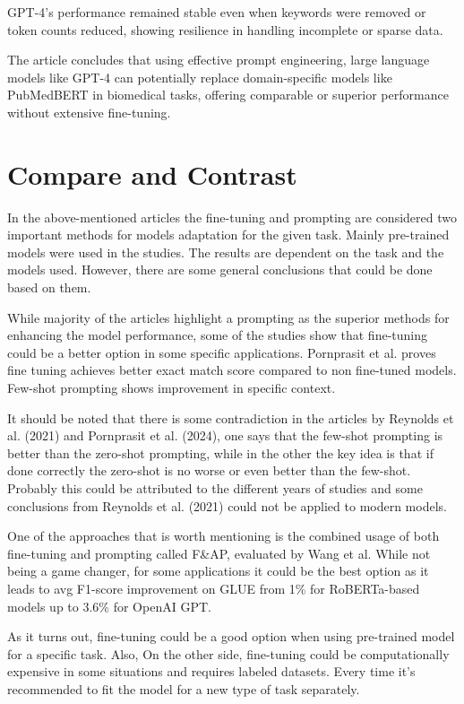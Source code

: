 \documentclass[11pt]{article}
\begin{document}
GPT-4's performance remained stable even when keywords were removed or token counts reduced, showing resilience in handling incomplete or sparse data.

The article concludes that using effective prompt engineering, large language models like GPT-4 can potentially replace domain-specific models like PubMedBERT in biomedical tasks, offering comparable or superior performance without extensive fine-tuning.

\section{Compare and Contrast}

In the above-mentioned articles the fine-tuning and prompting are considered two important methods for models adaptation for the given task. Mainly pre-trained models were used in the studies. The results are dependent on the task and the models used. However, there are some general conclusions that could be done based on them.

While majority of the articles highlight a prompting as the superior methods for enhancing the model performance, some of the studies show that fine-tuning could be a better option in some specific applications. Pornprasit et al. proves fine tuning achieves better exact match score compared to non fine-tuned models. Few-shot prompting shows improvement in specific context.

It should be noted that there is some contradiction in the articles by Reynolds et al. (2021) and Pornprasit et al. (2024), one says that the few-shot prompting is better than the zero-shot prompting, while in the other the key idea is that if done correctly the zero-shot is no worse or even better than the few-shot. Probably this could be attributed to the different years of studies and some conclusions from Reynolds et al. (2021) could not be applied to modern models.

One of the approaches that is worth mentioning is the combined usage of both fine-tuning and prompting called F\&AP, evaluated by Wang et al. While not being a game changer, for some applications it could be the best option as it leads to avg F1-score improvement on GLUE from 1\% for RoBERTa-based models up to 3.6\% for OpenAI GPT.

As it turns out, fine-tuning could be a good option when using pre-trained model for a specific task. Also, On the other side, fine-tuning could be computationally expensive in some situations and requires labeled datasets. Every time it's recommended to fit the model for a new type of task separately.
\end{document}
